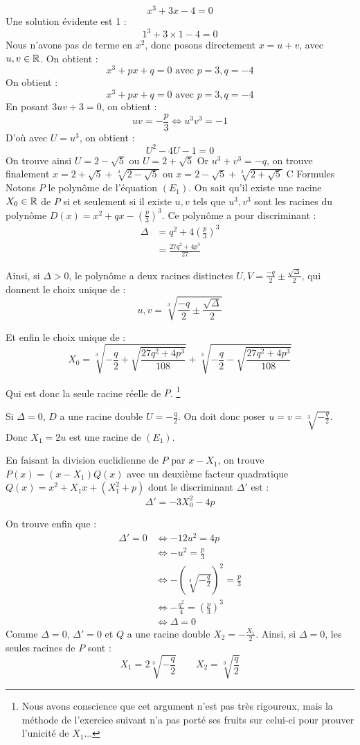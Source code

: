 \documentclass[]{../templates/homework}
\begin{document}
$$ x^3 + 3x - 4 = 0$$
\question Une solution évidente est 1 : $$1^3 + 3\times1 - 4 = 0$$
\question Nous n'avons pas de terme en $x^2$, donc posons directement $x = u+v$, avec $u, v \in \mathbb R$.
On obtient : $$x^3 + px + q = 0 \text{ avec } p=3, q=-4$$
On obtient : $$x^3 + px + q = 0 \text{ avec } p=3, q=-4$$
En posant $3uv + 3 = 0$, on obtient : $$uv = -\frac{p}{3} \iff u^3v^3 = -1$$
D'où avec $U = u^3$, on obtient : $$U^2 -4U -1 =0$$
On trouve ainsi $U = 2 - \sqrt{5}$ ou $U = 2 + \sqrt{5}$
Or $u^3 + v^3 = -q$, on trouve finalement $x = 2 + \sqrt{5} + \sqrt[3]{2 - \sqrt{5}}$ ou $x = 2 - \sqrt{5} + \sqrt[3]{2 + \sqrt{5}}$
\partie C {Formules}
 Notons $P$ le polynôme de l'équation $(E_1)$. On sait qu'il existe une racine $X_0 \in \mathbb R$ de $P$ si et seulement si il existe $u,v$ tels que $u^3,v^3$ sont les racines du polynôme $D(x) = x^2 + qx - \left(\frac p 3\right)^3$.
Ce polynôme a pour discriminant :
\begin{align*}
	\Delta &= q^2 + 4\left(\frac p 3\right)^3 \\
	&=  \frac {27q^2 + 4p^3}{27}
\end{align*}


Ainsi, si $\Delta > 0$, le polynôme a deux racines distinctes $U,V = \frac {-q}{2} \pm \frac {\sqrt \Delta} {2}$, qui donnent le choix unique de :
$$u,v = \sqrt[3]{\frac {-q}{2} \pm \frac {\sqrt \Delta} {2}}$$

Et enfin le choix unique de :
$$X_0 = \sqrt[3]{-\frac {q}{2} + \sqrt {\frac {27q^2 + 4p^3}{108}} } + \sqrt[3]{-\frac {q}{2} - \sqrt {\frac {27q^2 + 4p^3}{108}} }$$

Qui est donc la seule racine réelle de $P$. \footnote{Nous avons conscience que cet argument n'est pas très rigoureux, mais la méthode de l'exercice suivant n'a pas porté ses fruits sur celui-ci pour prouver l'unicité de $X_1$...}

\subproblem Si $\Delta = 0$, $D$ a une racine double $U = -\frac q {2}$. On doit donc poser $u = v = \sqrt[3]{-\frac q 2}$. Donc $X_1 = 2u$ est une racine de $(E_1)$.


En faisant la division euclidienne de $P$ par $x-X_1$, on trouve $P(x) = (x-X_1)Q(x)$ avec un deuxième facteur quadratique $Q(x) = x^2 + X_1x + (X_1^2 + p)$ dont le discriminant $\Delta'$ est :
$$\Delta' = -3X_0^2 - 4p$$

On trouve enfin que :
\begin{align*}
	\Delta' = 0 &\iff -12u^2 = 4p \\
	&\iff -u^2 = \frac p 3\\
	&\iff -(\sqrt[3]{-\frac q 2})^2 = \frac p3\\
	&\iff -\frac {q^2} 4 = (\frac p 3)^3\\
	&\iff \Delta = 0
\end{align*}
Comme $\Delta = 0$, $\Delta' = 0$ et $Q$ a une racine double $X_2 = -\frac {X_1} 2$.
Ainsi, si $\Delta = 0$, les seules racines de $P$ sont :
\begin{equation*}
	X_1 = 2\sqrt[3]{-\frac q 2} \qquad X_2 = \sqrt[3]{\frac q 2}
\end{equation*}
\end{document}
